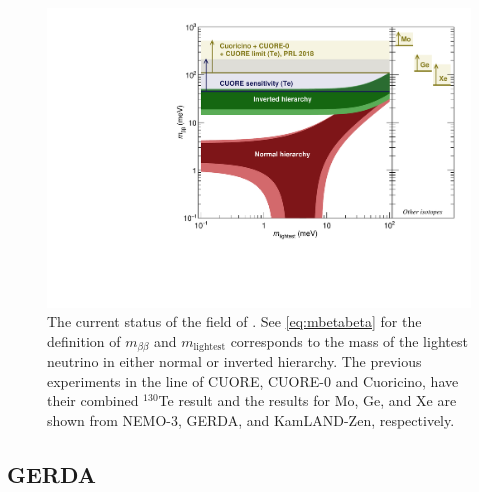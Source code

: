 \begin{figure}[htbp]
\centering
\includegraphics[width=0.7\linewidth]{Figures/M_bb_vs_mlightest_CL_2018.pdf}
\caption[The current status of the field of \zeronubb.]
{The current status of the field of \zeronubb. See \autoref{eq:mbetabeta} for the definition of $m_{\beta\beta}$ and $m_{\textrm{lightest}}$ corresponds to the mass of the lightest neutrino in either normal or inverted hierarchy.
The previous experiments in the line of CUORE, CUORE-0 and Cuoricino, have their combined $^{130}$Te result and the results for Mo, Ge, and Xe are shown from NEMO-3, GERDA, and KamLAND-Zen, respectively.}
\label{fig:cuore-mbetabeta}
\end{figure}

\subsection{GERDA}

